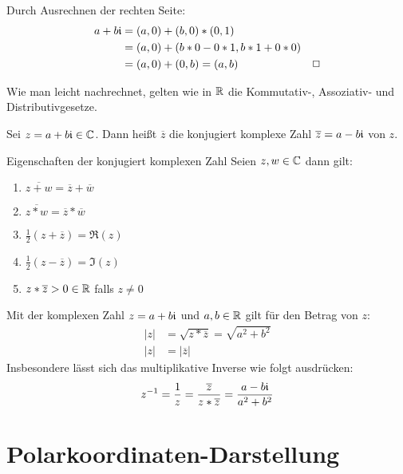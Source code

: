 \beweis Durch Ausrechnen der rechten Seite:
\begin{align*}
  a+b\mathfrak{i} &= (a,0)+(b,0)*(0,1)\\
  &=(a,0)+(b*0-0*1,b*1+0*0)\\
  &=(a,0)+(0,b)=(a,b) &\Box
\end{align*}

\bemerkung
Wie man leicht nachrechnet, gelten wie in $\mathbb{R}$ die Kommutativ-, Assoziativ- und Distributivgesetze.

Sei $z=a+b\mathfrak{i}\in\mathbb{C}$. Dann heißt $\overline z$ die konjugiert komplexe Zahl $\overline z=a-b\mathfrak{i}$ von $z$.

\begin{satz}{Eigenschaften der konjugiert komplexen Zahl}
  Seien $z,w\in\mathbb{C}$ dann gilt:
  \begin{enumerate}
    \item $\overline{z+w}=\overline z+\overline w$
    \item $\overline{z* w}=\overline z * \overline w$
    \item $\frac 1 2 (z+\overline z)=\Re(z)$
    \item $\frac 1 2 (z-\overline z)=\Im(z)$
    \item $z* \overline z > 0 \in\mathbb{R}$ falls $z\neq0$
  \end{enumerate}
\end{satz}

Mit der komplexen Zahl $z=a+b\mathfrak{i}$ und $a,b\in\mathbb{R}$ gilt für den Betrag von $z$:
\begin{align*}
  |z|&=\sqrt{z*\overline z}=\sqrt{a^2+b^2}\\
  |z|&=|\overline z|
\end{align*}
Insbesondere lässt sich das multiplikative Inverse wie folgt ausdrücken:
\begin{equation*}
  z^{-1}=\frac 1 z=\frac{\overline z}{z*\overline z}=\frac{a-b\mathfrak{i}}{a^2+b^2}
\end{equation*}

\section{Polarkoordinaten-Darstellung}
